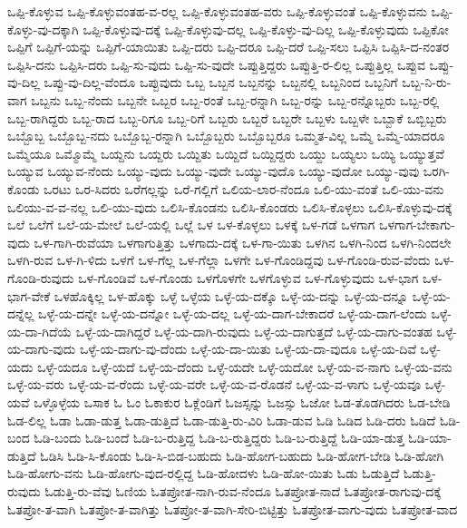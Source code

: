 {ಒಪ್ಪಿ-ಕೊಳ್ಳುವ
ಒಪ್ಪಿ-ಕೊಳ್ಳುವಂತಹ-ವ-ರಲ್ಲ
ಒಪ್ಪಿ-ಕೊಳ್ಳುವಂತಹ-ವರು
ಒಪ್ಪಿ-ಕೊಳ್ಳುವಂತೆ
ಒಪ್ಪಿ-ಕೊಳ್ಳುವನು
ಒಪ್ಪಿ-ಕೊಳ್ಳು-ವು-ದಕ್ಕಾಗಿ
ಒಪ್ಪಿ-ಕೊಳ್ಳುವು-ದಕ್ಕೆ
ಒಪ್ಪಿ-ಕೊಳ್ಳುವು-ದಲ್ಲ
ಒಪ್ಪಿ-ಕೊಳ್ಳು-ವು-ದಿಲ್ಲ
ಒಪ್ಪಿ-ಕೊಳ್ಳುವುದು
ಒಪ್ಪಿಕೋ
ಒಪ್ಪಿಗೆ
ಒಪ್ಪಿಗೆ-ಯನ್ನು
ಒಪ್ಪಿಗೆ-ಯಾಯಿತು
ಒಪ್ಪಿ-ದರು
ಒಪ್ಪಿ-ದರೂ
ಒಪ್ಪಿ-ದರೆ
ಒಪ್ಪಿ-ಸಲು
ಒಪ್ಪಿಸಿ
ಒಪ್ಪಿಸಿ-ದ-ನಂತರ
ಒಪ್ಪಿಸಿ-ದನು
ಒಪ್ಪಿಸಿ-ದರು
ಒಪ್ಪಿ-ಸು-ವುದು
ಒಪ್ಪಿ-ಸು-ವುದೇ
ಒಪ್ಪುತ್ತಿದ್ದರು
ಒಪ್ಪುತ್ತಿ-ರ-ಲಿಲ್ಲ
ಒಪ್ಪುತ್ತಿಲ್ಲ
ಒಪ್ಪುವ
ಒಪ್ಪು-ವು-ದಿಲ್ಲ
ಒಪ್ಪು-ವು-ದಿಲ್ಲ-ವೆಂದೂ
ಒಪ್ಪುವುದು
ಒಬ್ಬ
ಒಬ್ಬನ
ಒಬ್ಬನನ್ನು
ಒಬ್ಬನಲ್ಲಿ
ಒಬ್ಬನಿಂದ
ಒಬ್ಬನಿಗೆ
ಒಬ್ಬ-ನಿ-ರು-ವಾಗ
ಒಬ್ಬನು
ಒಬ್ಬ-ನೆಂದು
ಒಬ್ಬನೇ
ಒಬ್ಬರ
ಒಬ್ಬ-ರಂತೆ
ಒಬ್ಬ-ರನ್ನಾಗಿ
ಒಬ್ಬ-ರನ್ನು
ಒಬ್ಬ-ರನ್ನೊಬ್ಬರು
ಒಬ್ಬ-ರಲ್ಲಿ
ಒಬ್ಬ-ರಾಗಿದ್ದರು
ಒಬ್ಬ-ರಾದ
ಒಬ್ಬ-ರಿಗೂ
ಒಬ್ಬ-ರಿಗೆ
ಒಬ್ಬರು
ಒಬ್ಬರೆ
ಒಬ್ಬರೇ
ಒಬ್ಬಳು
ಒಬ್ಬಳೇ
ಒಬ್ಬಾಕೆ
ಒಬ್ಬಿಬ್ಬರು
ಒಬ್ಬೊಬ್ಬ
ಒಬ್ಬೊಬ್ಬ-ನದು
ಒಬ್ಬೊಬ್ಬ-ರನ್ನಾಗಿ
ಒಬ್ಬೊಬ್ಬರು
ಒಬ್ಬೊಬ್ಬರೂ
ಒಮ್ಮತ-ವಿಲ್ಲ
ಒಮ್ಮೆ
ಒಮ್ಮೆ-ಯಾದರೂ
ಒಮ್ಮೆಯೂ
ಒಮ್ಮೊಮ್ಮೆ
ಒಯ್ದನು
ಒಯ್ದರು
ಒಯ್ದಿತು
ಒಯ್ದಿದೆ
ಒಯ್ದಿದ್ದರು
ಒಯ್ದು
ಒಯ್ಯಲು
ಒಯ್ಯಿ
ಒಯ್ಯುತ್ತವೆ
ಒಯ್ಯುವ
ಒಯ್ಯುವ-ನೆಂದು
ಒಯ್ಯು-ವುದು
ಒಯ್ಯು-ವುದೇ
ಒಯ್ಯು-ವುದೊ
ಒಯ್ಯು-ವುದೋ
ಒಯ್ಯು-ವುವು
ಒರಗಿ-ಕೊಂಡು
ಒರಟು
ಒರ-ಸಿದರು
ಒರೆಗಲ್ಲನ್ನು
ಒರೆ-ಗಲ್ಲಿಗೆ
ಒಲಿಯ-ಲಾರ-ನೆಂದೂ
ಒಲಿ-ಯು-ವಂತೆ
ಒಲಿ-ಯು-ವನು
ಒಲಿಯು-ವ-ವ-ನಲ್ಲ
ಒಲಿ-ಯು-ವುದು
ಒಲಿಸಿ-ಕೊಂಡನು
ಒಲಿಸಿ-ಕೊಂಡರು
ಒಲಿಸಿ-ಕೊಳ್ಳಲು
ಒಲಿಸಿ-ಕೊಳ್ಳುವು-ದಕ್ಕೆ
ಒಲೆ
ಒಲೆಗೆ
ಒಲೆ-ಯ-ಮೇಲೆ
ಒಲೆ-ಯಲ್ಲಿ
ಒಲ್ಲೆ
ಒಳ
ಒಳ-ಕೊಳ್ಳಲು
ಒಳಕ್ಕೆ
ಒಳ-ಗಡೆ
ಒಳಗಾಗ
ಒಳಗಾಗ-ಬೇಕಾಗು-ವುದು
ಒಳ-ಗಾಗಿ-ರುವೆಯಾ
ಒಳಗಾಗುತ್ತಿತ್ತು
ಒಳಗಾದು-ದಕ್ಕೆ
ಒಳ-ಗಾ-ಯಿತು
ಒಳಗಿನ
ಒಳಗಿ-ನಿಂದ
ಒಳಗಿ-ನಿಂದಲೇ
ಒಳಗಿ-ರುವ
ಒಳ-ಗಿ-ಳಿದು
ಒಳಗೆ
ಒಳ-ಗೆಲ್ಲ
ಒಳ-ಗೆಲ್ಲಾ
ಒಳಗೇ
ಒಳ-ಗೊಂಡಿದ್ದವು
ಒಳ-ಗೊಂಡಿ-ರುವ-ವೆಂದು
ಒಳ-ಗೊಂಡಿ-ರುವುದು
ಒಳ-ಗೊಂಡಿವೆ
ಒಳ-ಗೊಂಡು
ಒಳಗೊಳಗೇ
ಒಳಗೊಳ್ಳುವ
ಒಳ-ಗೊಳ್ಳುವುದು
ಒಳ-ಭಾಗ
ಒಳ-ಭಾಗ-ವೇಕೆ
ಒಳಹೊಕ್ಕಿಲ್ಲ
ಒಳ-ಹೊಕ್ಕು
ಒಳ್ಳೆ
ಒಳ್ಳೆಯ
ಒಳ್ಳೆ-ಯ-ದಕ್ಕೊ
ಒಳ್ಳೆ-ಯ-ದನ್ನು
ಒಳ್ಳೆ-ಯ-ದನ್ನೂ
ಒಳ್ಳೆ-ಯ-ದನ್ನೆಲ್ಲ
ಒಳ್ಳೆ-ಯ-ದನ್ನೇ
ಒಳ್ಳೆ-ಯ-ದನ್ನೋ
ಒಳ್ಳೆ-ಯ-ದಲ್ಲ
ಒಳ್ಳೆ-ಯ-ದಾಗ-ಬೇಕಾದರೆ
ಒಳ್ಳೆ-ಯ-ದಾಗ-ಲೆಂದು
ಒಳ್ಳೆ-ಯ-ದಾ-ಗಿದೆಯೆ
ಒಳ್ಳೆ-ಯ-ದಾಗಿದ್ದರೆ
ಒಳ್ಳೆ-ಯ-ದಾಗಿ-ರುವುದು
ಒಳ್ಳೆ-ಯ-ದಾಗುತ್ತದೆ
ಒಳ್ಳೆ-ಯ-ದಾಗು-ವಂತಹ
ಒಳ್ಳೆ-ಯ-ದಾಗು-ವುದು
ಒಳ್ಳೆ-ಯ-ದಾಗು-ವು-ದೆಂದು
ಒಳ್ಳೆ-ಯ-ದಾ-ಯಿತು
ಒಳ್ಳೆ-ಯ-ದಾ-ವುದೂ
ಒಳ್ಳೆ-ಯ-ದಿವೆ
ಒಳ್ಳೆ-ಯದು
ಒಳ್ಳೆ-ಯದೂ
ಒಳ್ಳೆ-ಯದೆ
ಒಳ್ಳೆ-ಯ-ದೆಂದು
ಒಳ್ಳೆ-ಯದೇ
ಒಳ್ಳೆ-ಯದೋ
ಒಳ್ಳೆ-ಯ-ವ-ನಾಗು
ಒಳ್ಳೆ-ಯ-ವನು
ಒಳ್ಳೆ-ಯ-ವರು
ಒಳ್ಳೆ-ಯ-ವ-ರೆಂದು
ಒಳ್ಳೆ-ಯ-ವರೇ
ಒಳ್ಳೆ-ಯ-ವ-ರೊಡನೆ
ಒಳ್ಳೆ-ಯ-ವ-ಳಾಗು
ಒಳ್ಳೆ-ಯವೂ
ಒಳ್ಳೆ-ಯವೆ
ಒಳ್ಳೊಳ್ಳೆಯ
ಒಸಾಕ
ಓ
ಓಂ
ಓಕಾಕುರ
ಓಕ್ಲೆಂಡಿಗೆ
ಓಜಸ್ಸನ್ನು
ಓಜಸ್ಸು
ಓಜೋ
ಓಡ-ತೊಡಗಿದರು
ಓಡ-ಬೇಡಿ
ಓಡ-ಲಿಲ್ಲ
ಓಡಾ
ಓಡಾ-ಡುತ್ತ
ಓಡಾ-ಡುತ್ತಿದೆ
ಓಡಾ-ಡುತ್ತಿ-ರು-ವಿರಿ
ಓಡಾ-ಡುವ
ಓಡಿ
ಓಡಿದ
ಓಡಿ-ದರು
ಓಡಿದೆ
ಓಡಿ-ಬಂದ
ಓಡಿ-ಬಂದು
ಓಡಿ-ಬಂದೆ
ಓಡಿ-ಬ-ರುತ್ತಿದ್ದ
ಓಡಿ-ಬ-ರುತ್ತಿದ್ದರು
ಓಡಿ-ಬ-ರುತ್ತಿದ್ದೆ
ಓಡಿ-ಯಾ-ಡುತ್ತ
ಓಡಿ-ಯಾ-ಡುತ್ತಿದೆ
ಓಡಿಸಿ
ಓಡಿ-ಸಿ-ಕೊಂಡು
ಓಡಿ-ಸಿ-ಬಿಡ-ಬಹುದು
ಓಡಿ-ಹೋಗ-ಬಹುದು
ಓಡಿ-ಹೋಗ-ಬೇಡಿ
ಓಡಿ-ಹೋಗಿ
ಓಡಿ-ಹೋಗು-ವನು
ಓಡಿ-ಹೋಗು-ವುದ-ರಲ್ಲಿದ್ದ
ಓಡಿ-ಹೋದಳು
ಓಡಿ-ಹೋ-ಯಿತು
ಓಡು
ಓಡುತ್ತಿದೆ
ಓಡುತ್ತಿ-ರುವುದು
ಓಡುತ್ತಿ-ರು-ವೆವು
ಓಣಿಯ
ಓತಪ್ರೋತ-ನಾಗಿ-ರುವ-ನೆಂದೂ
ಓತಪ್ರೋತ-ನಾದೆ
ಓತಪ್ರೋತ-ರಾಗುವು-ದಕ್ಕೆ
ಓತಪ್ರೋ-ತ-ವಾಗಿ
ಓತಪ್ರೋ-ತ-ವಾಗಿತ್ತು
ಓತಪ್ರೋ-ತ-ವಾಗಿ-ಸೇರಿ-ಬಿಟ್ಟಿತ್ತು
ಓತಪ್ರೋತ-ವಾಗು-ವುದು
ಓತಪ್ರೋತ-ವಾದ
}
